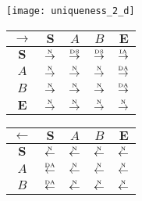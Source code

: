 \begin{figure}[htbp]
  \begin{subfigure}{1\textwidth}
    \vspace{1em}
    \centering
    \begin{minipage}[b]{1\textwidth}
      \centering
      \texttt{[image: uniqueness\_2\_d]}
    \end{minipage}
    \begin{minipage}[b]{0.3\textwidth}
      \vspace{1em}
      \centering
      \begin{tabular}{|c|c|c|c|c|} \hline
        $\rightarrow$ & $\bm{S}$ & $A$ & $B$ & $\bm{E}$\\ \hline
        $\bm{S}$ & $\overset{\text{\tiny{N}}}{\rightarrow}$ & $\overset{\text{\tiny{DS}}}{\rightarrow}$ & $\overset{\text{\tiny{DS}}}{\rightarrow}$ & $\overset{\text{\tiny{IA}}}{\rightarrow}$\\ \hline
        $A$ & $\overset{\text{\tiny{N}}}{\rightarrow}$ & $\overset{\text{\tiny{N}}}{\rightarrow}$ & $\overset{\text{\tiny{N}}}{\rightarrow}$ & $\overset{\text{\tiny{DA}}}{\rightarrow}$\\ \hline
        $B$ & $\overset{\text{\tiny{N}}}{\rightarrow}$ & $\overset{\text{\tiny{N}}}{\rightarrow}$ & $\overset{\text{\tiny{N}}}{\rightarrow}$ & $\overset{\text{\tiny{DA}}}{\rightarrow}$\\ \hline
        $\bm{E}$ & $\overset{\text{\tiny{N}}}{\rightarrow}$ & $\overset{\text{\tiny{N}}}{\rightarrow}$ & $\overset{\text{\tiny{N}}}{\rightarrow}$ & $\overset{\text{\tiny{N}}}{\rightarrow}$\\ \hline
      \end{tabular}
    \end{minipage}
    \begin{minipage}[b]{0.3\textwidth}
      \vspace{1em}
      \centering
      \begin{tabular}{|c|c|c|c|c|} \hline
        $\leftarrow$ & $\bm{S}$ & $A$ & $B$ & $\bm{E}$\\ \hline
        $\bm{S}$ & $\overset{\text{\tiny{N}}}{\leftarrow}$ & $\overset{\text{\tiny{N}}}{\leftarrow}$ & $\overset{\text{\tiny{N}}}{\leftarrow}$ & $\overset{\text{\tiny{N}}}{\leftarrow}$\\ \hline
        $A$ & $\overset{\text{\tiny{DA}}}{\leftarrow}$ & $\overset{\text{\tiny{N}}}{\leftarrow}$ & $\overset{\text{\tiny{N}}}{\leftarrow}$ & $\overset{\text{\tiny{N}}}{\leftarrow}$\\ \hline
        $B$ & $\overset{\text{\tiny{DA}}}{\leftarrow}$ & $\overset{\text{\tiny{N}}}{\leftarrow}$ & $\overset{\text{\tiny{N}}}{\leftarrow}$ & $\overset{\text{\tiny{N}}}{\leftarrow}$\\ \hline

\end{tabular}
\end{minipage}
\end{subfigure}
\end{figure}
